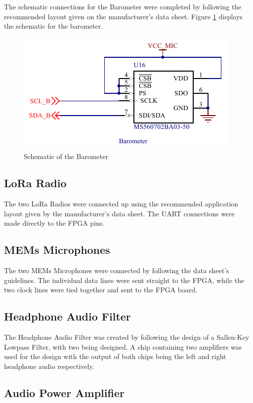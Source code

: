 	The schematic connections for the Barometer were completed by following the recommended layout given on the manufacturer's data sheet. 
Figure \ref{fig:barometer} displays the schematic for the barometer. 

\begin{figure}
	\includegraphics[width=0.5\linewidth]{Figures/barometer.pdf}\centering
	\caption{Schematic of the Barometer}
	\label{fig:barometer}
\end{figure}

\subsection{LoRa Radio}

	The two LoRa Radios were connected up using the recommended application layout given by the manufacturer's data sheet. 
The UART connections were made directly to the FPGA pins. 

\subsection{MEMs Microphones}
\label{chap:mics}

	The two MEMs Microphones were connected by following the data sheet's guidelines. The individual data lines were sent straight to the FPGA, while the two clock lines were tied together and sent to the FPGA board. 

\subsection{Headphone Audio Filter} 
\label{chap:audio2}

	The Headphone Audio Filter was created by following the design of a Sallen-Key Lowpass Filter, with two being designed. A chip containing two amplifiers was used for the design with the output of both chips being the left and right headphone audio respectively. 

\subsection{Audio Power Amplifier}
\label{chap:audio}


